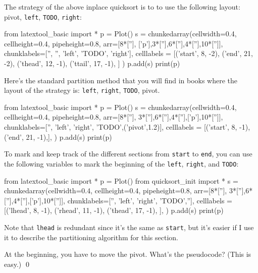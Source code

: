 The strategy of the above inplace quicksort is to to use the following
layout: pivot, \verb!left!, \verb!TODO!, \verb!right!:
\begin{python}
from latextool_basic import *
p = Plot()
s = chunkedarray(cellwidth=0.4, 
                   cellheight=0.4,
                   pipeheight=0.8,
                   arr=[8*[''], ['p'],3*[''],6*[''],4*[''],10*['']],
                   chunklabels=['', '', 'left', 'TODO', 'right'],
                   celllabels = [('start', 8, -2),
                                 ('end',   21, -2),
                                 ('thead', 12, -1),
                                 ('ttail', 17, -1),
                                ]
)
p.add(s)
print(p)
\end{python}

Here's the standard partition method that you will find in books
where the layout of the strategy is:
\verb!left!, \verb!right!, \verb!TODO!, pivot.
\begin{python}
from latextool_basic import *
p = Plot()
s = chunkedarray(cellwidth=0.4, 
                   cellheight=0.4,
                   pipeheight=0.8,
                   arr=[8*[''], 3*[''],6*[''],4*[''],['p'],10*['']],
                   chunklabels=['', 'left', 'right', 'TODO',('pivot',1.2)],
                   celllabels = [('start', 8, -1),
                                 ('end',   21, -1),],
)
p.add(s)
print(p)
\end{python}
To mark and keep track of the different sections from \verb!start! to
\verb!end!, you can use the following variables to mark the beginning
of the \verb!left!, \verb!right!, and \verb!TODO!:
\begin{python}
from latextool_basic import *
p = Plot()
from quicksort_init import *
s = chunkedarray(cellwidth=0.4, 
                   cellheight=0.4,
                   pipeheight=0.8,
                   arr=[8*[''], 3*[''],6*[''],4*[''],['p'],10*['']],
                   chunklabels=['', 'left', 'right', 'TODO',''],
                   celllabels = [('lhead', 8, -1),
                                 ('rhead', 11, -1),
                                 ('thead', 17, -1),
                                ],
)
p.add(s)
print(p)
\end{python}
Note that \verb!lhead! is redundant since it's the same as
\verb!start!, but it's easier if I use it to describe the partitioning
algorithm for this section.


\begin{ex}
At the beginning, you have to move the pivot.
What's the pseudocode? (This is easy.)
\qed
\end{ex}

